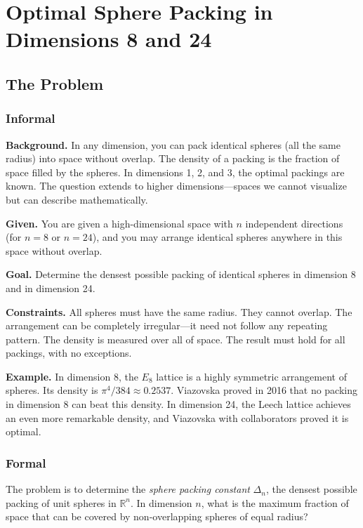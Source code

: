 \let\LocalMacro\relax

\chapter{Optimal Sphere Packing in Dimensions 8 and 24}

\section{The Problem}

\subsection{Informal}

\textbf{Background.} In any dimension, you can pack identical spheres (all the same radius) into space without overlap. The density of a packing is the fraction of space filled by the spheres. In dimensions 1, 2, and 3, the optimal packings are known. The question extends to higher dimensions---spaces we cannot visualize but can describe mathematically.

\textbf{Given.} You are given a high-dimensional space with $n$ independent directions (for $n = 8$ or $n = 24$), and you may arrange identical spheres anywhere in this space without overlap.

\textbf{Goal.} Determine the densest possible packing of identical spheres in dimension 8 and in dimension 24.

\textbf{Constraints.} All spheres must have the same radius. They cannot overlap. The arrangement can be completely irregular---it need not follow any repeating pattern. The density is measured over all of space. The result must hold for all packings, with no exceptions.

\textbf{Example.} In dimension 8, the $E_8$ lattice is a highly symmetric arrangement of spheres. Its density is $\pi^4/384 \approx 0.2537$. Viazovska proved in 2016 that no packing in dimension 8 can beat this density. In dimension 24, the Leech lattice achieves an even more remarkable density, and Viazovska with collaborators proved it is optimal.

\subsection{Formal}
The problem is to determine the \emph{sphere packing constant} $\Delta_n$, the densest possible packing of unit spheres in $\mathbb{R}^n$. In dimension $n$, what is the maximum fraction of space that can be covered by non-overlapping spheres of equal radius?

